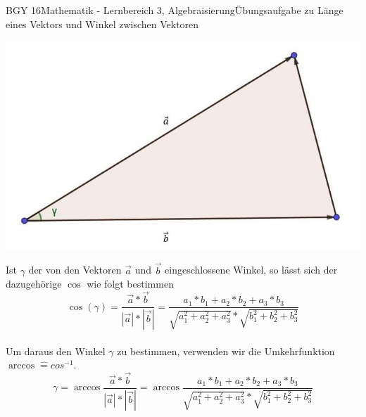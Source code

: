 \documentclass[oneside,openany,headings=optiontotoc,11pt,numbers=noenddot]{scrreprt}
\begin{document}
\begin{worksheet}{BGY 16}{Mathematik - Lernbereich 3, Algebraisierung}{Übungsaufgabe zu Länge eines Vektors und Winkel zwischen Vektoren}
\begin{framed}
			\centering
			\includegraphics[scale=0.45]{Bilder/Dreieck.jpg}\\
			\raggedright
			Ist \(\gamma\) der von den Vektoren \(\vec{a}\) und \(\vec{b}\) eingeschlossene Winkel, so lässt sich der dazugehörige \(\cos\) wie folgt bestimmen
			\[\cos(\gamma) = \frac{\vec{a}*\vec{b}}{|\vec{a}|*|\vec{b}|} = \frac{a_1*b_1 + a_2*b_2 + a_3*b_3}{\sqrt{a_1^2 + a_2^2 + a_3^2}*\sqrt{b_1^2 + b_2^2 + b_3^2}}\]\\
			Um daraus den Winkel \(\gamma\) zu bestimmen, verwenden wir die Umkehrfunktion \(\arccos \widehat{=}cos^{-1}\).
			\[\gamma = \arccos{\frac{\vec{a}*\vec{b}}{|\vec{a}|*|\vec{b}|}} = \arccos{\frac{a_1*b_1 + a_2*b_2 + a_3*b_3}{\sqrt{a_1^2 + a_2^2 + a_3^2}*\sqrt{b_1^2 + b_2^2 + b_3^2}}}\]
		\end{framed}
	\end{worksheet}
\end{document}
